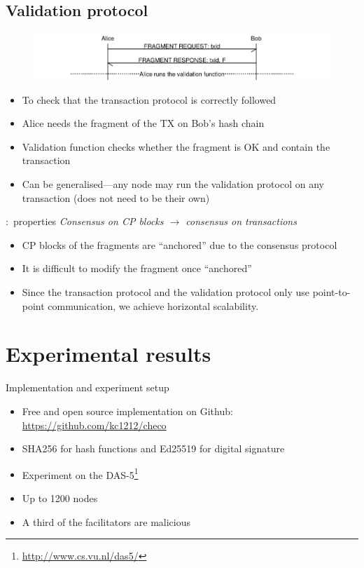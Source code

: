 \documentclass{beamer}
\begin{document}
\subsection{Validation protocol}
\begin{frame}{\subsecname}
  \begin{figure}[h]
  \includegraphics[width=1.0\textwidth]{vd-proto}
  \centering
  \end{figure}
\begin{itemize}
\item To check that the transaction protocol is correctly followed
\item Alice needs the fragment of the TX on Bob's hash chain 
\item Validation function checks whether the fragment is OK and contain the transaction
\item Can be generalised---any node may run the validation protocol on any transaction (does not need to be their own)
\end{itemize}
\end{frame}

\begin{frame}{\subsecname:~properties}
\emph{Consensus on CP blocks $\rightarrow$ consensus on transactions}
\bigskip
\begin{itemize}
  \item CP blocks of the fragments are ``anchored'' due to the consensus protocol
  \item It is difficult to modify the fragment once ``anchored''
  \item Since the transaction protocol and the validation protocol only use point-to-point communication,
  we achieve horizontal scalability.
\end{itemize}
\end{frame}

\section{Experimental results}
\begin{frame}{Implementation and experiment setup}
  \begin{itemize}
    \item Free and open source implementation on Github:
      \url{https://github.com/kc1212/checo}
    \item SHA256 for hash functions and Ed25519 for digital signature
    \item Experiment on the DAS-5\footnote{\url{http://www.cs.vu.nl/das5/}}
    \item Up to 1200 nodes
    \item A third of the facilitators are malicious
  \end{itemize}
\end{frame}
\end{document}
